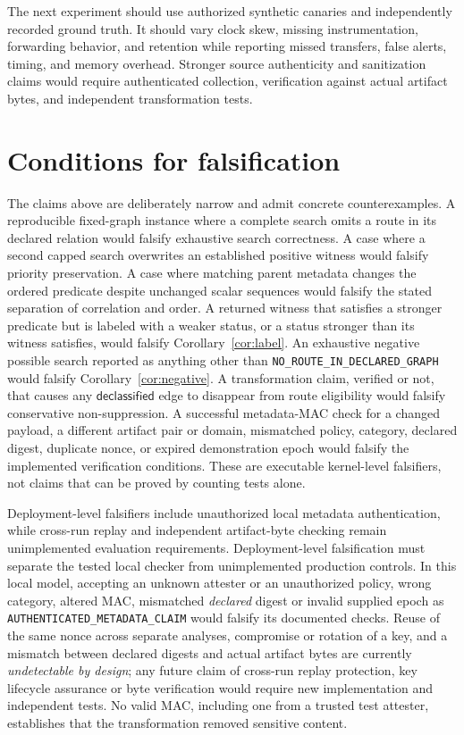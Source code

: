 \documentclass[11pt,letterpaper]{article}
\newcommand{\code}[1]{\texttt{#1}}
\newcommand{\st}[1]{\texttt{\scriptsize #1}}
\begin{document}
The next experiment should use authorized synthetic canaries and independently recorded ground truth. It should vary clock skew, missing instrumentation, forwarding behavior, and retention while reporting missed transfers, false alerts, timing, and memory overhead. Stronger source authenticity and sanitization claims would require authenticated collection, verification against actual artifact bytes, and independent transformation tests.

\section{Conditions for falsification}
The claims above are deliberately narrow and admit concrete counterexamples. A reproducible fixed-graph instance where a complete search omits a route in its declared relation would falsify exhaustive search correctness. A case where a second capped search overwrites an established positive witness would falsify priority preservation. A case where matching parent metadata changes the ordered predicate despite unchanged scalar sequences would falsify the stated separation of correlation and order. A returned witness that satisfies a stronger predicate but is labeled with a weaker status, or a status stronger than its witness satisfies, would falsify Corollary~\ref{cor:label}. An exhaustive negative possible search reported as anything other than \st{NO\_ROUTE\_IN\_DECLARED\_GRAPH} would falsify Corollary~\ref{cor:negative}. A transformation claim, verified or not, that causes any \(\mathsf{declassified}\) edge to disappear from route eligibility would falsify conservative non-suppression. A successful metadata-MAC check for a changed payload, a different artifact pair or domain, mismatched policy, category, declared digest, duplicate nonce, or expired demonstration epoch would falsify the implemented verification conditions. These are executable kernel-level falsifiers, not claims that can be proved by counting tests alone.

Deployment-level falsifiers include unauthorized local metadata authentication, while cross-run replay and independent artifact-byte checking remain unimplemented evaluation requirements. Deployment-level falsification must separate the tested local checker from unimplemented production controls. In this local model, accepting an unknown attester or an unauthorized policy, wrong category, altered MAC, mismatched \emph{declared} digest or invalid supplied epoch as \code{AUTHENTICATED\_METADATA\_CLAIM} would falsify its documented checks. Reuse of the same nonce across separate analyses, compromise or rotation of a key, and a mismatch between declared digests and actual artifact bytes are currently \emph{undetectable by design}; any future claim of cross-run replay protection, key lifecycle assurance or byte verification would require new implementation and independent tests. No valid MAC, including one from a trusted test attester, establishes that the transformation removed sensitive content.
\end{document}
